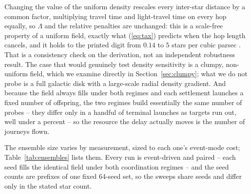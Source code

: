 Changing the value of the uniform density rescales every inter-star distance by a common factor, multiplying travel time and
light-travel time on every hop equally, so $\Lambda$ and the relative penalties are unchanged: this
is a scale-free property of a uniform field, exactly what (\ref{eq:tax}) predicts when the hop
length cancels, and it holds to the printed digit from $0.14$ to $5$ stars per cubic
parsec \citep{recons-census}. That is a consistency check on the derivation, not an independent
robustness result. The case that would genuinely test density sensitivity is a clumpy, non-uniform field, which
we examine directly in Section~\ref{sec:clumpy}; what we do not probe is a full galactic disk with a
large-scale radial density gradient. And because the field always fills under
both regimes and each settlement launches a fixed number of offspring, the two regimes build
essentially the same number of probes -- they differ only in a handful of terminal launches as
targets run out, well under a percent -- so the resource the delay actually moves is the number of journeys flown.

The ensemble size varies by measurement, sized to each one's event-mode cost; Table~\ref{tab:ensembles}
lists them. Every run is event-driven and paired -- each seed fills the identical field under both
coordination regimes -- and the seed counts are prefixes of one fixed 64-seed set, so the sweeps share
seeds and differ only in the stated star count.

